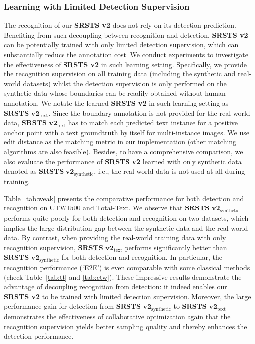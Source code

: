 \subsubsection{Learning with Limited Detection Supervision}
The recognition of our \textbf{SRSTS v2} does not rely on its detection prediction. Benefiting from such decoupling between recognition and detection, \textbf{SRSTS v2} can be potentially trained with only limited detection supervision, which can substantially reduce the annotation cost.
We conduct experiments to investigate the effectiveness of \textbf{SRSTS v2} in such learning setting. Specifically, we provide the recognition supervision on all training data (including the synthetic and real-world datasets) whilst the detection supervision is only performed on the synthetic data whose boundaries can be readily obtained without human annotation. We notate the learned \textbf{SRSTS v2} in such learning setting as $\textbf{SRSTS v2}_\text{text}$. Since the boundary annotation is not provided for the real-world data, $\textbf{SRSTS v2}_\text{text}$ has to match each predicted text instance for a positive anchor point with a text groundtruth by itself for multi-instance images. We use edit distance as the matching metric in our implementation (other matching algorithms are also feasible). Besides, to have a comprehensive comparison, we also evaluate the performance of \textbf{SRSTS v2} learned with only synthetic data denoted as $\textbf{SRSTS v2}_\text{synthetic}$, i.e., the real-world data is not used at all during training.

Table~\ref{tab:weak} presents the comparative performance for both detection and recognition on CTW1500 and Total-Text. We observe that $\textbf{SRSTS v2}_\text{synthetic}$ performs quite poorly for both detection and recognition on two datasets, which implies the large distribution gap between the synthetic data and the real-world data. By contrast, when providing the real-world training data with only recognition supervision, $\textbf{SRSTS v2}_\text{text}$ performs significantly better than $\textbf{SRSTS v2}_\text{synthetic}$ for both detection and recognition. In particular, the recognition performance (`E2E') is even comparable with some classical methods (check Table~\ref{tab:tt} and \ref{tab:ctw}). These impressive results demonstrate the advantage of decoupling recognition from detection: it indeed enables our \textbf{SRSTS v2} to be trained with limited detection supervision. Moreover, the large performance gain for detection from $\textbf{SRSTS v2}_\text{synthetic}$ to $\textbf{SRSTS v2}_\text{text}$ demonstrates the effectiveness of collaborative optimization again that the recognition supervision yields better sampling quality and thereby enhances the detection performance.

